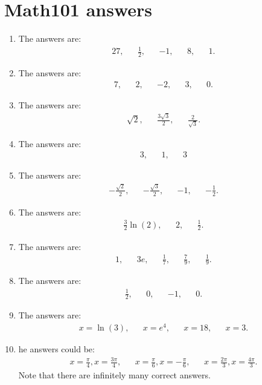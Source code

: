 \newpage
\section{Math101 answers}
\begin{enumerate}
	\item The answers are:
	\begin{align*}
	27,&& \frac{1}{2}, &&-1,&&8,&&1.
	\end{align*}
	\item The answers are:
	\begin{align*}
	7,&& 2,&& -2,&& 3,&&0.
	\end{align*}
	
	\item The answers are:
	\begin{align*}
	\sqrt{2},&& \frac{3\sqrt{3}}{2},&& \frac{2}{\sqrt{3}}.
	\end{align*}
	

	\item The answers are:
	\begin{align*}
	3,&&1,&& 3
	\end{align*}
	
	\item The answers are:
	\begin{align*}
	-\frac{\sqrt{2}}{2},&& -\frac{\sqrt{3}}{2},&&-1,&& -\frac{1}{2}.
	\end{align*}
	
	
	\item The answers are:
	\begin{align*}
	\frac{3}{2}\ln(2),&& 2,&& \frac{1}{2}.
	\end{align*}
	
	
	\item The answers are:
	\begin{align*}
	1,&&3e,&& \frac{1}{7},&& \frac{7}{9},&& \frac{1}{9}.
	\end{align*}
	
	\item The answers are:
	\begin{align*}
	\frac{1}{2},&& 0,&& -1,&& 0.
	\end{align*}
	
	
	\item The answers are: 
	\begin{align*}
	x=\ln(3),&& x=e^4,&& x=18,&& x=3.
	\end{align*}
	

	\item he answers could be:
	\begin{align*}
	x=\frac{\pi}{4},x=\frac{3\pi}{4},&& x=\frac{\pi}{6},x=-\frac{\pi}{6},&& x=\frac{2\pi}{3},x=\frac{4\pi}{3}.
	\end{align*}
	Note that there are infinitely many correct answers.


\end{enumerate}
